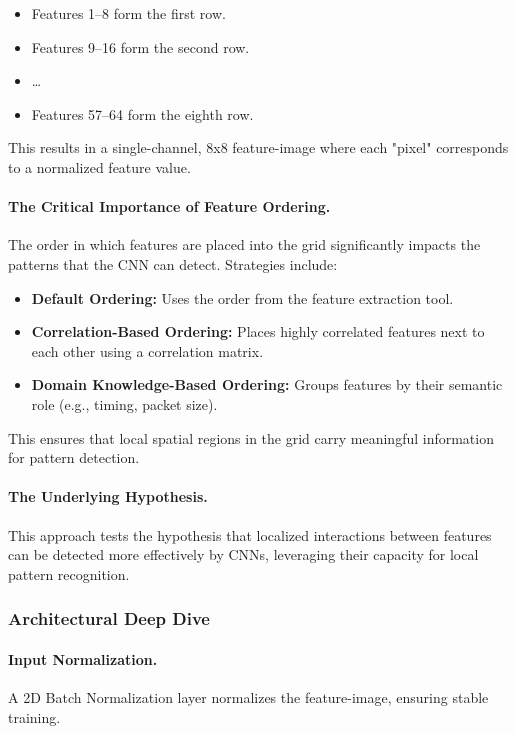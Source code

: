 \documentclass{report}
\begin{document}
\begin{itemize}
\item Features 1--8 form the first row.
\item Features 9--16 form the second row.
\item \ldots
\item Features 57--64 form the eighth row.
\end{itemize}

This results in a single-channel, 8x8 feature-image where each "pixel" corresponds to a normalized feature value.

\paragraph{The Critical Importance of Feature Ordering.} The order in which features are placed into the grid significantly impacts the patterns that the CNN can detect. Strategies include:

\begin{itemize}
\item \textbf{Default Ordering:} Uses the order from the feature extraction tool.
\item \textbf{Correlation-Based Ordering:} Places highly correlated features next to each other using a correlation matrix.
\item \textbf{Domain Knowledge-Based Ordering:} Groups features by their semantic role (e.g., timing, packet size).
\end{itemize}

This ensures that local spatial regions in the grid carry meaningful information for pattern detection.

\paragraph{The Underlying Hypothesis.} This approach tests the hypothesis that localized interactions between features can be detected more effectively by CNNs, leveraging their capacity for local pattern recognition.

\subsubsection{Architectural Deep Dive}

\paragraph{Input Normalization.} A 2D Batch Normalization layer normalizes the feature-image, ensuring stable training.
\end{document}
